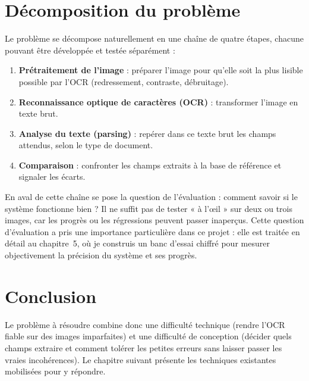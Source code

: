 \section{Décomposition du problème}

Le problème se décompose naturellement en une chaîne de quatre étapes, chacune pouvant être développée et testée séparément :

\begin{enumerate}
  \item \textbf{Prétraitement de l'image} : préparer l'image pour qu'elle soit la plus lisible possible par l'OCR (redressement, contraste, débruitage).
  \item \textbf{Reconnaissance optique de caractères (OCR)} : transformer l'image en texte brut.
  \item \textbf{Analyse du texte (parsing)} : repérer dans ce texte brut les champs attendus, selon le type de document.
  \item \textbf{Comparaison} : confronter les champs extraits à la base de référence et signaler les écarts.
\end{enumerate}

En aval de cette chaîne se pose la question de l'évaluation : comment savoir si le système fonctionne bien ? Il ne suffit pas de tester « à l'œil » sur deux ou trois images, car les progrès ou les régressions peuvent passer inaperçus. Cette question d'évaluation a pris une importance particulière dans ce projet : elle est traitée en détail au chapitre~5, où je construis un banc d'essai chiffré pour mesurer objectivement la précision du système et ses progrès.

\section{Conclusion}

Le problème à résoudre combine donc une difficulté technique (rendre l'OCR fiable sur des images imparfaites) et une difficulté de conception (décider quels champs extraire et comment tolérer les petites erreurs sans laisser passer les vraies incohérences). Le chapitre suivant présente les techniques existantes mobilisées pour y répondre.
